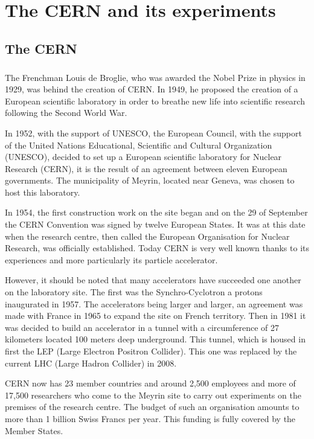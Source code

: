 \documentclass[../main.tex]{subfiles}
\begin{document}
\chapter{The CERN and its experiments}
\section{The CERN}
\paragraph{}
The Frenchman Louis de Broglie, who was awarded the Nobel Prize in physics in 1929, was behind the creation of CERN. 
In 1949, he proposed the creation of a European scientific laboratory in order to breathe new life into scientific research following the Second World War.
\par \noindent \newline
In 1952, with the support of UNESCO, the European Council, with the support of the United Nations Educational, Scientific and Cultural Organization (UNESCO), decided to set up a European scientific laboratory for Nuclear Research (CERN), it is the result of an agreement between eleven European governments. The municipality of Meyrin, located near Geneva, was chosen to host this laboratory.
\par \noindent \newline
In 1954, the first construction work on the site began and on the 29 of September the CERN Convention was signed by twelve European States. It was at this date when the research centre, then called the European Organisation for Nuclear Research, was officially established.
Today CERN is very well known thanks to its experiences and more particularly its particle accelerator.
\par \noindent \newline
However, it should be noted that many accelerators have succeeded one another on the laboratory site. 
The first was the Synchro-Cyclotron a protons inaugurated in 1957. The accelerators being larger and larger, an agreement was made with France in 1965 to expand the site on French territory. 
Then in 1981 it was decided to build an accelerator in a tunnel with a circumference of 27 kilometers located 100 meters deep underground. 
This tunnel, which is housed in first the LEP (Large Electron Positron Collider). This one was replaced by the current LHC (Large Hadron Collider) in 2008.
\par \noindent \newline
CERN now has 23 member countries and around 2,500 employees and more of 17,500 researchers who come to the Meyrin site to carry out experiments on the premises of the research centre. 
The budget of such an organisation amounts to more than 1 billion Swiss Francs per year.
This funding is fully covered by the Member States.
\end{document}
